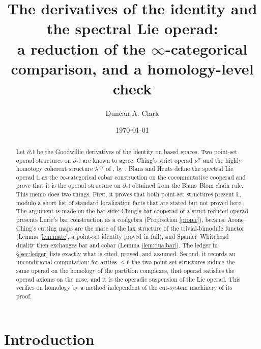 \documentclass[11pt]{amsart}
\title[Derivatives of the identity and the spectral Lie operad]{The derivatives of the identity and the spectral Lie operad:\\ a reduction of the $\infty$-categorical comparison, and a homology-level check}
\author{Duncan A. Clark}
\date{\today}
\theoremstyle{definition}
\theoremstyle{remark}
\newcommand{\Id}{\mathbb{I}}
\newcommand{\Lie}{\mathbb{L}}
\newcommand{\Lev}{\mathrm{lev}}
\newcommand{\tr}{\mathrm{tr}}
\begin{document}
\begin{abstract}
Let $\partial_*\Id$ be the Goodwillie derivatives of the identity on based spaces. Two point-set operad structures on $\partial_*\Id$ are known to agree: Ching's strict operad $\nu^{\tr}$ and the highly homotopy coherent structure $\lambda^{\Lev}$ of \cite{Cl2}, by \cite[Theorem 1.3]{Cl2}. Blans and Heuts define the spectral Lie operad $\Lie$ as the $\infty$-categorical cobar construction on the cocommutative cooperad and prove that it is the operad structure on $\partial_*\Id$ obtained from the Blans--Blom chain rule. This memo does two things. First, it proves that both point-set structures present $\Lie$, modulo a short list of standard localization facts that are stated but not proved here. The argument is made on the bar side: Ching's bar cooperad of a strict reduced operad presents Lurie's bar construction as a coalgebra (Proposition \ref{prop:c}), because Arone--Ching's cutting maps are the mate of the lax structure of the trivial-bimodule functor (Lemma \ref{lem:mate}, a point-set identity proved in full), and Spanier--Whitehead duality then exchanges bar and cobar (Lemma \ref{lem:dualbar}). The ledger in \S\ref{sec:ledger} lists exactly what is cited, proved, and assumed. Second, it records an unconditional computation: for arities $\leq 6$ the two point-set structures induce the same operad on the homology of the partition complexes, that operad satisfies the operad axioms on the nose, and it is the operadic suspension of the Lie operad. This verifies \cite[Theorem 1.3]{Cl2} on homology by a method independent of the cut-system machinery of its proof.
\end{abstract}

\maketitle

\tableofcontents

\section{Introduction}
\end{document}
